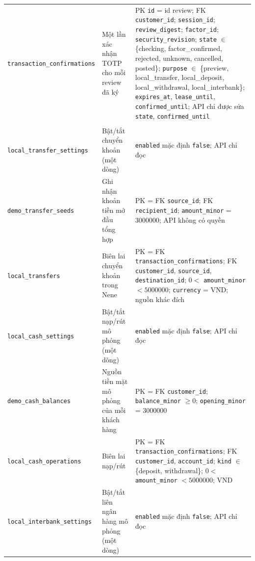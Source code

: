 {\begin{longtable}{>{\raggedright\arraybackslash}p{}>{\raggedright\arraybackslash}p{}>{\raggedright\arraybackslash}p{}}
\texttt{transaction\_\allowbreak confirmations} & Một lần xác nhận TOTP cho mỗi review đã ký & PK \texttt{id} = id review; FK \texttt{customer\_\allowbreak{}id}; \texttt{session\_\allowbreak{}id}; \texttt{review\_\allowbreak{}digest}; \texttt{factor\_\allowbreak{}id}; \texttt{security\_\allowbreak{}revision}; \texttt{state} $\in$ \{checking, factor\_confirmed, rejected, unknown, cancelled, posted\}; \texttt{purpose} $\in$ \{preview, local\_transfer, local\_deposit, local\_withdrawal, local\_interbank\}; \texttt{expires\_\allowbreak{}at}, \texttt{lease\_\allowbreak{}until}, \texttt{confirmed\_\allowbreak{}until}; API chỉ được sửa \texttt{state}, \texttt{confirmed\_\allowbreak{}until} \\
\multicolumn{3}{l}{\textit{Giao dịch tiền demo}} \\
\texttt{local\_transfer\_\allowbreak settings} & Bật/tắt chuyển khoản (một dòng) & \texttt{enabled} mặc định \texttt{false}; API chỉ đọc \\
\texttt{demo\_transfer\_\allowbreak seeds} & Ghi nhận khoản tiền mở đầu tổng hợp & PK = FK \texttt{source\_\allowbreak{}id}; FK \texttt{recipient\_\allowbreak{}id}; \texttt{amount\_\allowbreak{}minor} = 3000000; API không có quyền \\
\texttt{local\_\allowbreak{}transfers} & Biên lai chuyển khoản trong Nene & PK = FK \texttt{transaction\_\allowbreak{}confirmations}; FK \texttt{customer\_\allowbreak{}id}, \texttt{source\_\allowbreak{}id}, \texttt{destination\_\allowbreak{}id}; $0 <$ \texttt{amount\_\allowbreak{}minor} $< 5000000$; \texttt{currency} = VND; nguồn khác đích \\
\texttt{local\_cash\_\allowbreak settings} & Bật/tắt nạp/rút mô phỏng (một dòng) & \texttt{enabled} mặc định \texttt{false}; API chỉ đọc \\
\texttt{demo\_\allowbreak{}cash\_\allowbreak{}balances} & Nguồn tiền mặt mô phỏng của mỗi khách hàng & PK = FK \texttt{customer\_\allowbreak{}id}; \texttt{balance\_\allowbreak{}minor} $\geq 0$; \texttt{opening\_\allowbreak{}minor} = 3000000 \\
\texttt{local\_cash\_\allowbreak operations} & Biên lai nạp/rút & PK = FK \texttt{transaction\_\allowbreak{}confirmations}; FK \texttt{customer\_\allowbreak{}id}, \texttt{account\_\allowbreak{}id}; \texttt{kind} $\in$ \{deposit, withdrawal\}; $0 <$ \texttt{amount\_\allowbreak{}minor} $< 5000000$; VND \\
\texttt{local\_interbank\_\allowbreak settings} & Bật/tắt liên ngân hàng mô phỏng (một dòng) & \texttt{enabled} mặc định \texttt{false}; API chỉ đọc \\

\end{longtable}}
